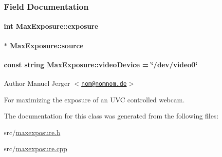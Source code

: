\subsubsection{\-Field \-Documentation}
\hypertarget{classMaxExposure_a0edc3ff74bb09c91f812be79cf2f8612}{
\paragraph[{exposure}]{\setlength{\rightskip}{0pt plus 5cm}int {\bf \-Max\-Exposure\-::exposure}}}\label{classMaxExposure_a0edc3ff74bb09c91f812be79cf2f8612}
\hypertarget{classMaxExposure_a80825e655ef83dad0d95b50befdf0580}{
\paragraph[{source}]{$\ast$ {\bf \-Max\-Exposure\-::source}}}\label{classMaxExposure_a80825e655ef83dad0d95b50befdf0580}
\hypertarget{classMaxExposure_a3c4c2e4996102280ad51357283dea7f2}{
\paragraph[{video\-Device}]{\setlength{\rightskip}{0pt plus 5cm}const string {\bf \-Max\-Exposure\-::video\-Device} = \char`\"{}/dev/video0\char`\"{}}}\label{classMaxExposure_a3c4c2e4996102280ad51357283dea7f2}
\begin{DoxyAuthor}{\-Author}
\-Manuel \-Jerger $<$\href{mailto:nom@nomnom.de}{\tt nom@nomnom.\-de}$>$
\end{DoxyAuthor}
\-For maximizing the exposure of an \-U\-V\-C controlled webcam. 

\-The documentation for this class was generated from the following files\-:\begin{DoxyCompactItemize}
\item 
src/\hyperlink{maxexposure_8h}{maxexposure.\-h}\item 
src/\hyperlink{maxexposure_8cpp}{maxexposure.\-cpp}\end{DoxyCompactItemize}
